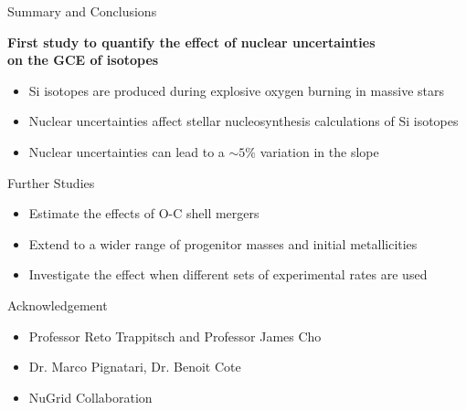 \documentclass[10pt]{beamer}
\begin{document}
\begin{frame}{Summary and Conclusions}
        \begin{center}
            \textbf{First study to quantify the effect of nuclear uncertainties \\on the GCE of isotopes}
        \end{center}
        \begin{itemize}
        \setlength\itemsep{2em}
            \item Si isotopes are produced during explosive oxygen burning in massive stars
            \item Nuclear uncertainties affect stellar nucleosynthesis calculations of Si isotopes
            \item Nuclear uncertainties can lead to a $\sim5\%$ variation in the slope
        \end{itemize}

\end{frame}

\begin{frame}{Further Studies}
    \begin{itemize}
    \setlength\itemsep{2em}
        \item Estimate the effects of O-C shell mergers
        \item Extend to a wider range of progenitor masses and initial metallicities 
        \item Investigate the effect when different sets of experimental rates are used
        
    \end{itemize}
\end{frame}

\begin{frame}{Acknowledgement}

\begin{itemize}
\setlength\itemsep{2em}
    \item Professor Reto Trappitsch and Professor James Cho
    \item Dr. Marco Pignatari, Dr. Benoit Cote
    \item NuGrid Collaboration
\end{itemize}
\end{frame}




\end{document}
